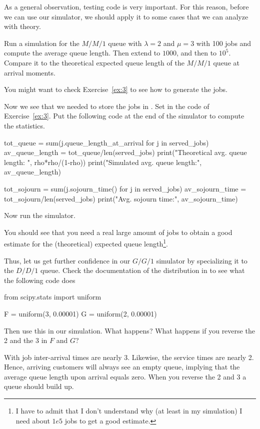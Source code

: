 As a general observation, testing code is very important. For this reason, before we can use our simulator, we should apply it to some cases that we can analyze with theory. 

\begin{exercise}
  Run a simulation for the $M/M/1$ queue with $\lambda=2$ and $\mu=3$ with 100 jobs and compute the average queue length. Then extend to $1000$, and then to $10^5$. Compare it to the theoretical expected queue length of the $M/M/1$ queue at arrival moments.

  \begin{hint}
You might want to check Exercise~\ref{ex:3} to see how to generate the jobs.
    \end{hint}
  \begin{solution}
Now we see that we needed to store the jobs in . Set  in the code of Exercise~\ref{ex:3}. Put the following code at the end of the simulator to compute the statistics. 
    \begin{pyverbatim}

tot_queue = sum(j.queue_length_at_arrival for j in served_jobs)
av_queue_length = tot_queue/len(served_jobs)
print("Theoretical avg. queue length: ", rho*rho/(1-rho))
print("Simulated avg. queue length:", av_queue_length)
      
tot_sojourn = sum(j.sojourn_time() for j in served_jobs)
av_sojourn_time = tot_sojourn/len(served_jobs)
print("Avg. sojourn time:", av_sojourn_time)
\end{pyverbatim}

Now run the simulator.

You should see that you need a real large amount of jobs to obtain a good estimate for the (theoretical) expected queue length\footnote{I have to admit that I don't understand why (at least in my simulation) I need about $1e5$ jobs to get a good estimate.}. 

  \end{solution}
\end{exercise}

\begin{exercise}
 Thus, let us get further confidence in our $G/G/1$ simulator by specializing it to the $D/D/1$ queue. Check the documentation of the  distribution in  to see what the following code does
  \begin{pyverbatim}
from scipy.stats import uniform

F = uniform(3, 0.00001)
G = uniform(2, 0.00001)
\end{pyverbatim}

Then use this in our simulation. What happens? What happens if you reverse the 2 and the 3 in $F$ and $G$?
\begin{solution}
  With  job inter-arrival times are nearly 3.
  Likewise, the service times are nearly 2.
  Hence, arriving customers will always see an empty queue, implying that the average queue length upon arrival equals zero.
  When you reverse the 2 and 3 a queue should build up.
\end{solution}
\end{exercise}



